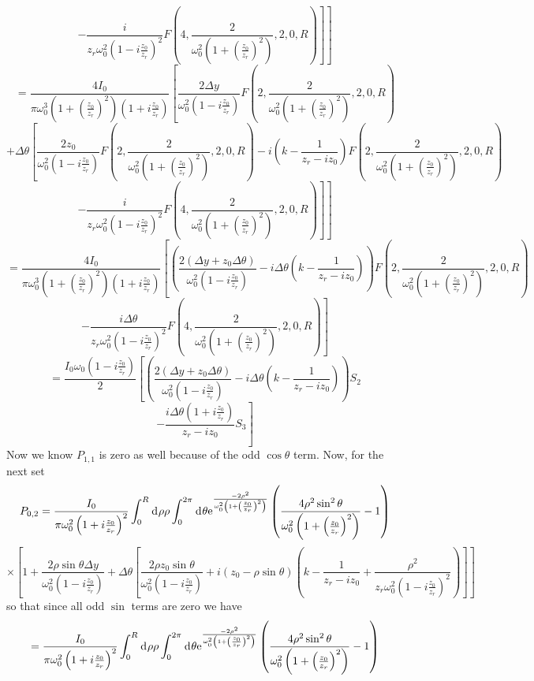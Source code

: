 \documentclass[11pt]{amsart}
\makeatletter
\newcommand{\e}{{\rm e}}				%
\newcommand{\msp}[1]{\mspace{#1mu}}		%
\newcommand{\0}{\varnothing}		%
\newcommand{\dd}{\msp{1} {\rm{d}} \msp{1}}	%
\newcommand{\1}{!}
\newcommand{\2}{@}
\newcommand{\3}{\#}
\newcommand{\4}{\$}
\newcommand{\5}{\%}
\newcommand{\6}{$^\wedge$}
\newcommand{\7}{\&}
\newcommand{\8}{*}
\newcommand{\9}{(}
\makeatother
\begin{document}
\[
\left.\left. - \frac{i}{z_r\omega_0^2\left(1-i\frac{z_0}{z_r}\right)^2}F\left(4,\frac{2}{\omega_0^2\left(1+\left(\frac{z_0}{z_r}\right)^2\right)},2,0,R\right)\right]\right]
\]
\[
=\frac{4I_0}{\pi\omega_0^3\left(1+\left(\frac{z_0}{z_r}\right)^2\right)\left(1+i\frac{z_0}{z_r}\right)}\left[\frac{2\Delta y}{\omega_0^2\left(1-i\frac{z_0}{z_r}\right)}F\left(2,\frac{2}{\omega_0^2\left(1+\left(\frac{z_0}{z_r}\right)^2\right)},2,0,R\right) 
\right.
\]
\[
\left.+ \Delta \theta\left[\frac{2z_0}{\omega_0^2\left(1-i\frac{z_0}{z_r}\right)}F\left(2,\frac{2}{\omega_0^2\left(1+\left(\frac{z_0}{z_r}\right)^2\right)},2,0,R\right)-i\left(k-\frac{1}{z_r-iz_0}\right)F\left(2,\frac{2}{\omega_0^2\left(1+\left(\frac{z_0}{z_r}\right)^2\right)},2,0,R\right)\right.\right.
\]
\[
\left.\left.-\frac{i}{z_r\omega_0^2\left(1-i\frac{z_0}{z_r}\right)^2}F\left(4,\frac{2}{\omega_0^2\left(1+\left(\frac{z_0}{z_r}\right)^2\right)},2,0,R\right)\right]\right]
\]
\[
=\frac{4I_0}{\pi\omega_0^3\left(1+\left(\frac{z_0}{z_r}\right)^2\right)\left(1+i\frac{z_0}{z_r}\right)}\left[\left(\frac{2\left(\Delta y + z_0\Delta \theta\right)}{\omega_0^2\left(1-i\frac{z_0}{z_r}\right)}-i\Delta \theta\left(k-\frac{1}{z_r-iz_0}\right)\right)F\left(2,\frac{2}{\omega_0^2\left(1+\left(\frac{z_0}{z_r}\right)^2\right)},2,0,R\right)\right.
\]
\[
\left. -\frac{i\Delta \theta}{z_r\omega_0^2\left(1-i\frac{z_0}{z_r}\right)^2}F\left(4,\frac{2}{\omega_0^2\left(1+\left(\frac{z_0}{z_r}\right)^2\right)},2,0,R\right)\right]
\]
\[
= \frac{I_0\omega_0\left(1-i\frac{z_0}{z_r}\right)}{2}\left[\left(\frac{2\left(\Delta y + z_0\Delta \theta\right)}{\omega_0^2\left(1-i\frac{z_0}{z_r}\right)}-i\Delta \theta\left(k-\frac{1}{z_r-iz_0}\right)\right)S_2\right.
\]
\[
\left.-\frac{i\Delta \theta\left(1+i\frac{z_0}{z_r}\right)}{z_r-iz_0}S_3\right]
\]
Now we know $P_{1,1}$ is zero as well because of the odd $\cos\theta$ term. Now, for the next set
\[
P_{0,2} = \frac{I_0}{\pi\omega_0^2\left(1+i\frac{z_0}{z_r}\right)^2}\int_0^R\dd \rho \rho\int_0^{2\pi}\dd \theta\e^{\frac{-2\rho^2}{\omega_0^2\left(1+\left(\frac{z_0}{z_r}\right)^2\right)}}\left(\frac{4\rho^2\sin^2\theta}{\omega_0^2\left(1+\left(\frac{z_0}{z_r}\right)^2\right)}-1\right)
\]
\[
\times\left[1+\frac{2\rho\sin\theta\Delta y}{\omega_0^2\left(1-i\frac{z_0}{z_r}\right)}+\Delta \theta\left[\frac{2\rho z_0\sin \theta}{\omega_0^2\left(1-i\frac{z_0}{z_r}\right)}+i\left(z_0-\rho\sin\theta\right)\left(k-\frac{1}{z_r-iz_0}+\frac{\rho^2}{z_r\omega_0^2\left(1-i\frac{z_0}{z_r}\right)^2}\right)\right]\right]
\]
so that since all odd $\sin$ terms are zero we have
\[
=\frac{I_0}{\pi\omega_0^2\left(1+i\frac{z_0}{z_r}\right)^2}\int_0^R\dd \rho \rho \int_0^{2\pi}\dd \theta \e^{\frac{-2\rho^2}{\omega_0^2\left(1+\left(\frac{z_0}{z_r}\right)^2\right)}}\left(\frac{4\rho^2\sin^2\theta}{\omega_0^2\left(1+\left(\frac{z_0}{z_r}\right)^2\right)}-1\right)
\]
\end{document}
